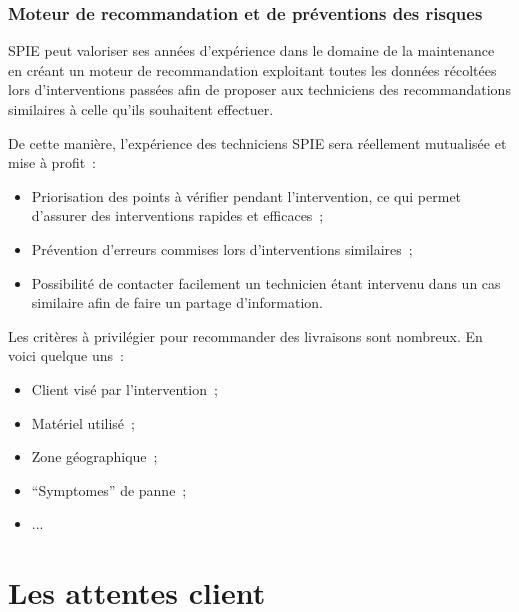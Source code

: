         \subsubsection{Moteur de recommandation et de préventions des risques}

            SPIE peut valoriser ses années d'expérience dans le domaine de la maintenance en créant un moteur de recommandation exploitant toutes les données récoltées lors d'interventions passées afin de proposer aux techniciens des recommandations similaires à celle qu'ils souhaitent effectuer.

            De cette manière, l'expérience des techniciens SPIE sera réellement mutualisée et mise à profit~:

            \begin{itemize}
                \item Priorisation des points à vérifier pendant l'intervention, ce qui permet d'assurer des interventions rapides et efficaces~;
                \item Prévention d'erreurs commises lors d'interventions similaires~;
                \item Possibilité de contacter facilement un technicien étant intervenu dans un cas similaire afin de faire un partage d'information.
            \end{itemize}

            Les critères à privilégier pour recommander des livraisons sont nombreux. En voici quelque uns~:
            \begin{itemize}
                \item Client visé par l'intervention~;
                \item Matériel utilisé~;
                \item Zone géographique~;
                \item ``Symptomes'' de panne~;
                \item ...
            \end{itemize}



\section{Les attentes client}

